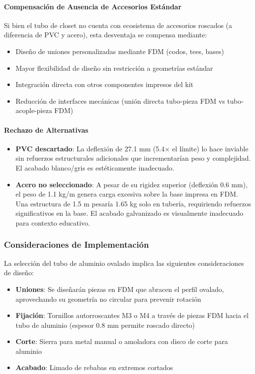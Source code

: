 \paragraph{Compensación de Ausencia de Accesorios Estándar}

Si bien el tubo de closet no cuenta con ecosistema de accesorios roscados (a diferencia de PVC y acero), esta desventaja se compensa mediante:
\begin{itemize}
    \item Diseño de uniones personalizadas mediante FDM (codos, tees, bases)
    \item Mayor flexibilidad de diseño sin restricción a geometrías estándar
    \item Integración directa con otros componentes impresos del kit
    \item Reducción de interfaces mecánicas (unión directa tubo-pieza FDM vs tubo-acople-pieza FDM)
\end{itemize}

\paragraph{Rechazo de Alternativas}

\begin{itemize}
    \item \textbf{PVC descartado}: La deflexión de 27.1 mm (5.4× el límite) lo hace inviable sin refuerzos estructurales adicionales que incrementarían peso y complejidad. El acabado blanco/gris es estéticamente inadecuado.
    
    \item \textbf{Acero no seleccionado}: A pesar de su rigidez superior (deflexión 0.6 mm), el peso de 1.1 kg/m genera carga excesiva sobre la base impresa en FDM. Una estructura de 1.5 m pesaría 1.65 kg solo en tubería, requiriendo refuerzos significativos en la base. El acabado galvanizado es visualmente inadecuado para contexto educativo.
\end{itemize}

\subsubsection{Consideraciones de Implementación}

La selección del tubo de aluminio ovalado implica las siguientes consideraciones de diseño:

\begin{itemize}
    \item \textbf{Uniones}: Se diseñarán piezas en FDM que abracen el perfil ovalado, aprovechando su geometría no circular para prevenir rotación
    \item \textbf{Fijación}: Tornillos autorroscantes M3 o M4 a través de piezas FDM hacia el tubo de aluminio (espesor 0.8 mm permite roscado directo)
    \item \textbf{Corte}: Sierra para metal manual o amoladora con disco de corte para aluminio
    \item \textbf{Acabado}: Limado de rebabas en extremos cortados
\end{itemize}


